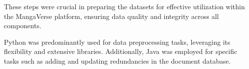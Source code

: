 \vspace{\baselineskip}

These steps were crucial in preparing the datasets for effective utilization within the MangaVerse platform, 
ensuring data quality and integrity across all components.

\vspace{\baselineskip}

Python was predominantly used for data preprocessing tasks, leveraging its flexibility and extensive libraries. 
Additionally, Java was employed for specific tasks such as adding and updating redundancies in the document database.